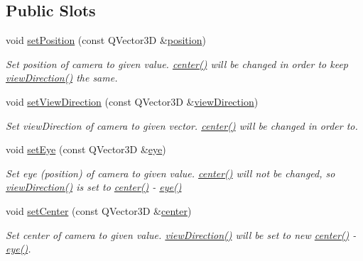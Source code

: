 \subsection*{Public Slots}
\begin{DoxyCompactItemize}
\item 
void \hyperlink{class_camera_a3ac4fcd89c146068205a3c8b73a86520}{set\+Position} (const Q\+Vector3\+D \&\hyperlink{class_camera_a1e8c173f6a47c5ebea0e91aefea50b51}{position})
\begin{DoxyCompactList}\small\item\em Set position of camera to given value. \hyperlink{class_camera_aacb30cc51aef5e3f98db5b51e3a4ef3b}{center()} will be changed in order to keep \hyperlink{class_camera_a7745654f918533ddc5e285bcf630e934}{view\+Direction()} the same. \end{DoxyCompactList}\item 
void \hyperlink{class_camera_a61a059ce3aedc779f9087dda9b5e227c}{set\+View\+Direction} (const Q\+Vector3\+D \&\hyperlink{class_camera_a7745654f918533ddc5e285bcf630e934}{view\+Direction})
\begin{DoxyCompactList}\small\item\em Set view\+Direction of camera to given vector. \hyperlink{class_camera_aacb30cc51aef5e3f98db5b51e3a4ef3b}{center()} will be changed in order to. \end{DoxyCompactList}\item 
void \hyperlink{class_camera_aa445664f0bf5f3cd892a99125e4bc786}{set\+Eye} (const Q\+Vector3\+D \&\hyperlink{class_camera_aac5808300c4e00d266da238ad35b1a1b}{eye})
\begin{DoxyCompactList}\small\item\em Set eye (position) of camera to given value. \hyperlink{class_camera_aacb30cc51aef5e3f98db5b51e3a4ef3b}{center()} will not be changed, so \hyperlink{class_camera_a7745654f918533ddc5e285bcf630e934}{view\+Direction()} is set to \hyperlink{class_camera_aacb30cc51aef5e3f98db5b51e3a4ef3b}{center()} -\/ \hyperlink{class_camera_aac5808300c4e00d266da238ad35b1a1b}{eye()} \end{DoxyCompactList}\item 
void \hyperlink{class_camera_ae0594124b7a1baf13ef38de7a6bd0ed8}{set\+Center} (const Q\+Vector3\+D \&\hyperlink{class_camera_aacb30cc51aef5e3f98db5b51e3a4ef3b}{center})
\begin{DoxyCompactList}\small\item\em Set center of camera to given value. \hyperlink{class_camera_a7745654f918533ddc5e285bcf630e934}{view\+Direction()} will be set to new \hyperlink{class_camera_aacb30cc51aef5e3f98db5b51e3a4ef3b}{center()} -\/ \hyperlink{class_camera_aac5808300c4e00d266da238ad35b1a1b}{eye()}. \end{DoxyCompactList}\item 

\end{DoxyCompactItemize}
